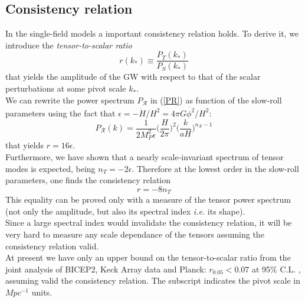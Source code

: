 \documentclass[11pt,a4paper,twoside]{book}
\begin{document}
\subsection{Consistency relation}
In the single-field models a important consistency relation holds. To derive it, we introduce the \textit{tensor-to-scalar ratio}
\begin{equation}
\label{tensorScalarRatio}
r(k_{*})\equiv \frac{P_{T}(k_{*})}{P_{S}(k_{*})}
\end{equation}
that yields  the amplitude of the GW with respect to that of the scalar perturbations at some pivot scale $ k_{*} $.\\
We can rewrite the power spectrum $ P_{\mathcal{R}} $ in (\ref{PR}) as function of the slow-roll parameters using the fact that $ \epsilon=-\dot{H}/H^{2}=4\pi G\dot{\phi^{2}}/H^{2} $:
\begin{equation}
	\label{PSRelatedToEpsilon}
P_{\mathcal{R}}(k)=\frac{1}{2M_{P}^{2}\epsilon}\Big (\frac{H}{2\pi}\Big)^{2}\Big (\frac{k}{aH}\Big)^{n_{\mathcal{R}}-1}	
\end{equation}
that yields $ r=16\epsilon $.\\
Furthermore, we have shown that a nearly scale-invariant spectrum of tensor modes is expected, being $ n_{T}=-2\epsilon $. Therefore at the lowest order in the slow-roll parameters, one finds the consistency relation
\begin{equation}
	\label{consistencyRelation}
	r=-8n_{T}
\end{equation}
This equality can be proved only with a measure of the tensor power spectrum (not only the amplitude, but also  its spectral index \textit{i.e.} its shape).\\
Since a large spectral index would invalidate the consistency relation, it will be very hard to measure any scale dependance of the tensors assuming the consistency relation valid.\\
At present we have only an upper bound on the tensor-to-scalar ratio from the joint analysis of BICEP2, Keck Array data and Planck: $ r_{0.05}<0.07 $ at  95$\% $ C.L. \cite{Bicep2:Intro}, assuming valid the consistency relation. The subscript indicates the pivot scale in $ Mpc^{-1} $ units.\\
\end{document}
